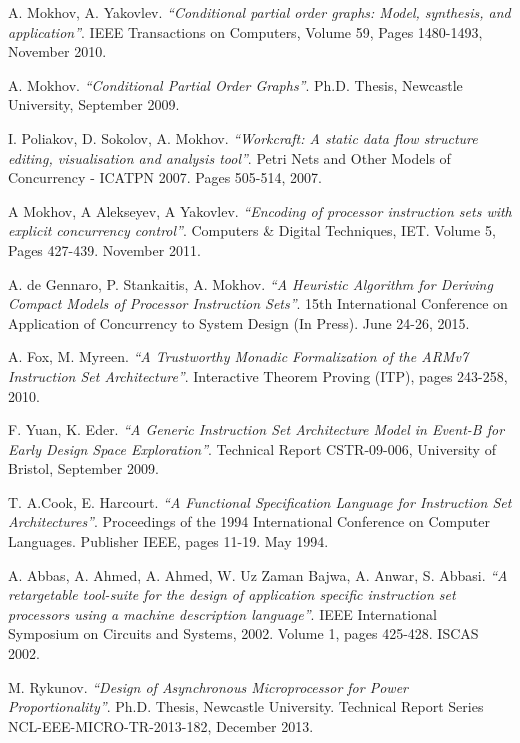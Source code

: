 \documentclass[conference]{IEEEtran}
\begin{document}
\begin{thebibliography}{1}

	A. Mokhov, A. Yakovlev. \emph{``Conditional partial order graphs: Model,
	synthesis, and application''}. IEEE Transactions on Computers, Volume 59,
	Pages 1480-1493, November 2010.
	
	A. Mokhov. \emph{``Conditional Partial Order Graphs''}. Ph.D. Thesis,
	Newcastle University, September 2009.	

	I. Poliakov, D. Sokolov, A. Mokhov. \emph{``Workcraft: A static data flow
	structure editing, visualisation and analysis tool''}. Petri Nets and Other
	Models of Concurrency - ICATPN 2007. Pages 505-514, 2007.
	
	A Mokhov, A Alekseyev, A Yakovlev. \emph{``Encoding of processor instruction
	sets with explicit concurrency control''}. Computers \& Digital Techniques,
	IET. Volume 5, Pages 427-439. November 2011.
	
	A. de Gennaro, P. Stankaitis, A. Mokhov. \emph{``A Heuristic Algorithm for
	Deriving Compact Models of Processor Instruction Sets''}. 15th International
	Conference on Application of Concurrency to System Design (In Press). June
	24-26, 2015.

	A. Fox, M. Myreen. \emph{``A Trustworthy Monadic Formalization of the ARMv7
	Instruction Set Architecture''}. Interactive Theorem Proving (ITP), pages
	243-258, 2010.	
	
	F. Yuan, K. Eder. \emph{``A Generic Instruction Set Architecture Model in
	Event-B for Early Design Space Exploration''}. Technical Report CSTR-09-006,
	University of Bristol, September 2009.

	T. A.Cook, E. Harcourt. \emph{``A Functional Specification Language for
	Instruction Set Architectures''}. Proceedings of the 1994 International
	Conference on Computer Languages. Publisher IEEE, pages 11-19. May 1994.
	
	A. Abbas, A. Ahmed, A. Ahmed, W. Uz Zaman Bajwa, A. Anwar, S. Abbasi. 
	\emph{``A retargetable tool-suite for the design of application specific
	instruction set processors using a machine description language''}. IEEE
	International Symposium on Circuits and Systems, 2002. Volume 1, pages 425-428.
	ISCAS 2002.
	
	M. Rykunov. \emph{``Design of Asynchronous Microprocessor for Power
	Proportionality''}. Ph.D. Thesis, Newcastle University. Technical Report Series
	NCL-EEE-MICRO-TR-2013-182, December 2013.
	

\end{thebibliography}
\end{document}
